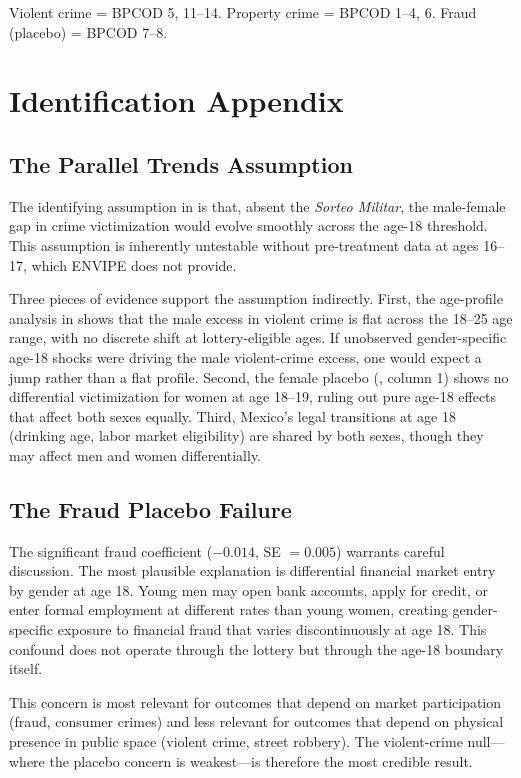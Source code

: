 \documentclass[12pt]{article}
\begin{document}
\noindent Violent crime = BPCOD 5, 11--14. Property crime = BPCOD 1--4, 6. Fraud (placebo) = BPCOD 7--8.


\section{Identification Appendix}
\label{app:identification}

\subsection{The Parallel Trends Assumption}

The identifying assumption in  is that, absent the \textit{Sorteo Militar}, the male-female gap in crime victimization would evolve smoothly across the age-18 threshold. This assumption is inherently untestable without pre-treatment data at ages 16--17, which ENVIPE does not provide.

Three pieces of evidence support the assumption indirectly. First, the age-profile analysis in  shows that the male excess in violent crime is flat across the 18--25 age range, with no discrete shift at lottery-eligible ages. If unobserved gender-specific age-18 shocks were driving the male violent-crime excess, one would expect a jump rather than a flat profile. Second, the female placebo (, column 1) shows no differential victimization for women at age 18--19, ruling out pure age-18 effects that affect both sexes equally. Third, Mexico's legal transitions at age 18 (drinking age, labor market eligibility) are shared by both sexes, though they may affect men and women differentially.

\subsection{The Fraud Placebo Failure}

The significant fraud coefficient ($-0.014$, SE $= 0.005$) warrants careful discussion. The most plausible explanation is differential financial market entry by gender at age 18. Young men may open bank accounts, apply for credit, or enter formal employment at different rates than young women, creating gender-specific exposure to financial fraud that varies discontinuously at age 18. This confound does not operate through the lottery but through the age-18 boundary itself.

This concern is most relevant for outcomes that depend on market participation (fraud, consumer crimes) and less relevant for outcomes that depend on physical presence in public space (violent crime, street robbery). The violent-crime null---where the placebo concern is weakest---is therefore the most credible result.
\end{document}
